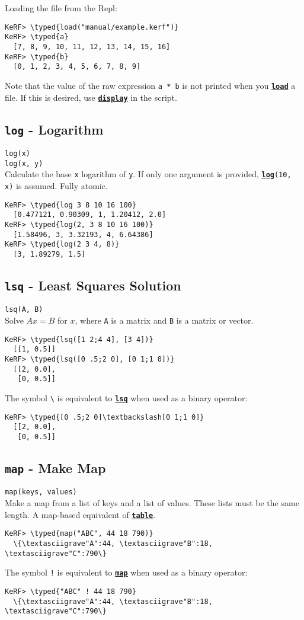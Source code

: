\documentclass{article}
\newcommand{\typed}[1]{\textcolor{TealBlue}{#1}}
\newcommand{\primdefu}[3]{\subsection{\texttt{#1} - #2}\label{prim:#3}}
\newcommand{\primu}[2]{\hyperref[prim:#2]{\textbf{\texttt{#1}}}}
\newcommand{\primdef}[2]{\primdefu{#1}{#2}{#1}}
\newcommand{\prim}[1]{\primu{#1}{#1}}
\begin{document}
Loading the file from the Repl:
\begin{Verbatim}
KeRF> \typed{load("manual/example.kerf")}
KeRF> \typed{a}
  [7, 8, 9, 10, 11, 12, 13, 14, 15, 16]
KeRF> \typed{b}
  [0, 1, 2, 3, 4, 5, 6, 7, 8, 9]
\end{Verbatim}
Note that the value of the raw expression \texttt{a * b} is not printed when you \prim{load} a file. If this is desired, use \prim{display} in the script.

\primdef{log}{Logarithm}
\texttt{log(x)}\\
\texttt{log(x, y)}\\

Calculate the base \texttt{x} logarithm of \texttt{y}. If only one argument is provided, \texttt{\prim{log}(10, x)} is assumed. Fully atomic.
\begin{Verbatim}
KeRF> \typed{log 3 8 10 16 100}
  [0.477121, 0.90309, 1, 1.20412, 2.0]
KeRF> \typed{log(2, 3 8 10 16 100)}
  [1.58496, 3, 3.32193, 4, 6.64386]
KeRF> \typed{log(2 3 4, 8)}
  [3, 1.89279, 1.5]
\end{Verbatim}

\pagebreak
\primdef{lsq}{Least Squares Solution}
\texttt{lsq(A, B)}\\

Solve $Ax = B$ for $x$, where \texttt{A} is a matrix and \texttt{B} is a matrix or vector.
\begin{Verbatim}
KeRF> \typed{lsq([1 2;4 4], [3 4])}
  [[1, 0.5]]
KeRF> \typed{lsq([0 .5;2 0], [0 1;1 0])}
  [[2, 0.0], 
   [0, 0.5]]
\end{Verbatim}

The symbol \texttt{\textbackslash} is equivalent to \prim{lsq} when used as a binary operator:
\begin{Verbatim}
KeRF> \typed{[0 .5;2 0]\textbackslash[0 1;1 0]}
  [[2, 0.0], 
   [0, 0.5]]
\end{Verbatim}

\primdef{map}{Make Map}
\texttt{map(keys, values)}\\

Make a map from a list of keys and a list of values. These lists must be the same length. A map-based equivalent of \prim{table}.
\begin{Verbatim}
KeRF> \typed{map("ABC", 44 18 790)}
  \{\textasciigrave"A":44, \textasciigrave"B":18, \textasciigrave"C":790\}
\end{Verbatim}

The symbol \texttt{!} is equivalent to \prim{map} when used as a binary operator:
\begin{Verbatim}
KeRF> \typed{"ABC" ! 44 18 790}
  \{\textasciigrave"A":44, \textasciigrave"B":18, \textasciigrave"C":790\}
\end{Verbatim}
\end{document}
